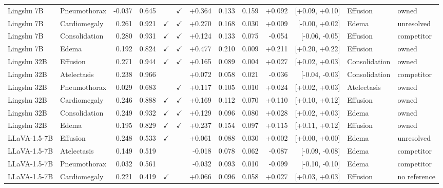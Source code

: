 \begin{longtable}{llrrccrrrrrll}
\rowcolor{cfSlate2}Lingshu 7B & Pneumothorax & -0.037 & 0.645 &  & $\checkmark$ & +0.364 & 0.133 & 0.159 & +0.092 & [+0.09, +0.10] & Effusion & owned \\
Lingshu 7B & Cardiomegaly & 0.261 & 0.921 & $\checkmark$ & $\checkmark$ & +0.270 & 0.168 & 0.030 & +0.009 & [-0.00, +0.02] & Edema & unresolved \\
Lingshu 7B & Consolidation & 0.280 & 0.931 & $\checkmark$ & $\checkmark$ & +0.124 & 0.133 & 0.075 & -0.054 & [-0.06, -0.05] & Effusion & competitor \\
\rowcolor{cfSlate2}Lingshu 7B & Edema & 0.192 & 0.824 & $\checkmark$ & $\checkmark$ & +0.477 & 0.210 & 0.009 & +0.211 & [+0.20, +0.22] & Effusion & owned \\
\rowcolor{cfSlate2}Lingshu 32B & Effusion & 0.271 & 0.944 & $\checkmark$ & $\checkmark$ & +0.165 & 0.089 & 0.004 & +0.027 & [+0.02, +0.03] & Consolidation & owned \\
Lingshu 32B & Atelectasis & 0.238 & 0.966 &  &  & +0.072 & 0.058 & 0.021 & -0.036 & [-0.04, -0.03] & Consolidation & competitor \\
\rowcolor{cfSlate2}Lingshu 32B & Pneumothorax & 0.029 & 0.683 &  & $\checkmark$ & +0.117 & 0.105 & 0.010 & +0.024 & [+0.02, +0.03] & Atelectasis & owned \\
\rowcolor{cfSlate2}Lingshu 32B & Cardiomegaly & 0.246 & 0.888 & $\checkmark$ & $\checkmark$ & +0.169 & 0.112 & 0.070 & +0.110 & [+0.10, +0.12] & Effusion & owned \\
\rowcolor{cfSlate2}Lingshu 32B & Consolidation & 0.249 & 0.932 & $\checkmark$ & $\checkmark$ & +0.129 & 0.096 & 0.080 & +0.028 & [+0.02, +0.03] & Edema & owned \\
\rowcolor{cfSlate2}Lingshu 32B & Edema & 0.195 & 0.829 & $\checkmark$ & $\checkmark$ & +0.237 & 0.154 & 0.097 & +0.115 & [+0.11, +0.12] & Effusion & owned \\
LLaVA-1.5-7B & Effusion & 0.248 & 0.533 & $\checkmark$ &  & +0.061 & 0.088 & 0.030 & +0.002 & [+0.00, +0.00] & Edema & unresolved \\
LLaVA-1.5-7B & Atelectasis & 0.149 & 0.519 &  &  & -0.018 & 0.078 & 0.062 & -0.087 & [-0.09, -0.08] & Edema & competitor \\
LLaVA-1.5-7B & Pneumothorax & 0.032 & 0.561 &  &  & -0.032 & 0.093 & 0.010 & -0.099 & [-0.10, -0.10] & Edema & competitor \\
LLaVA-1.5-7B & Cardiomegaly & 0.221 & 0.419 & $\checkmark$ &  & +0.066 & 0.096 & 0.058 & +0.027 & [+0.03, +0.03] & Effusion & no reference \\

\end{longtable}
